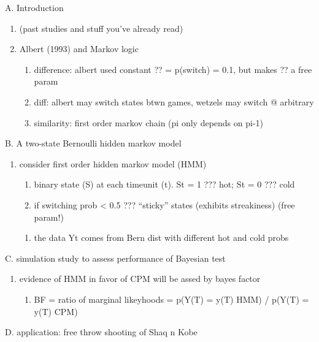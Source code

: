 \documentclass[12pt,twoside]{dukestatscithesis}
\providecommand{\tightlist}{%
  \setlength{\itemsep}{0pt}\setlength{\parskip}{0pt}}
\theoremstyle{definition}
\theoremstyle{definition}
\theoremstyle{definition}
\theoremstyle{remark}
\begin{document}
A. Introduction
\begin{enumerate}
\def\labelenumi{\arabic{enumi}.}
\tightlist
\item
  (past studies and stuff you've already read)
\item
  Albert (1993) and Markov logic
  \begin{enumerate}
  \def\labelenumii{\alph{enumii}.}
  \tightlist
  \item
    difference: albert used constant ?? = p(switch) = 0.1, but makes ??
    a free param
  \item
    diff: albert may switch states btwn games, wetzels may switch @
    arbitrary
  \item
    similarity: first order markov chain (pi only depends on pi-1)
  \end{enumerate}
\end{enumerate}
B. A two-state Bernoulli hidden markov model
\begin{enumerate}
\def\labelenumi{\arabic{enumi}.}
\tightlist
\item
  consider first order hidden markov model (HMM)
  \begin{enumerate}
  \def\labelenumii{\alph{enumii}.}
  \tightlist
  \item
    binary state (S) at each timeunit (t). St = 1 ??? hot; St = 0 ???
    cold
  \item
    if switching prob \textless{} 0.5 ??? ``sticky'' states (exhibits
    streakiness) (free param!)
  \end{enumerate}
  \begin{enumerate}
  \def\labelenumii{\roman{enumii}.}
  \setcounter{enumii}{2}
  \tightlist
  \item
    the data Yt comes from Bern dist with different hot and cold probs
  \end{enumerate}
\end{enumerate}
C. simulation study to assess performance of Bayesian test
\begin{enumerate}
\def\labelenumi{\arabic{enumi}.}
\tightlist
\item
  evidence of HMM in favor of CPM will be assed by bayes factor
  \begin{enumerate}
  \def\labelenumii{\alph{enumii}.}
  \tightlist
  \item
    BF = ratio of marginal likeyhoods = p(Y(T) = y(T) \textbar{} HMM) /
    p(Y(T) = y(T) \textbar{} CPM)
  \end{enumerate}
\end{enumerate}
D. application: free throw shooting of Shaq n Kobe
\end{document}

